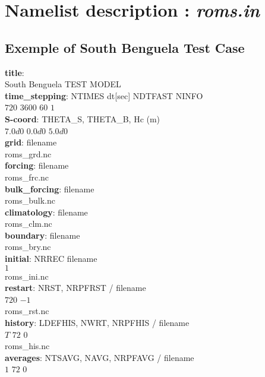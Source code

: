 \section{Namelist description : \textit{roms.in}}\label{namelistdesc}

\subsection{Exemple of South Benguela Test Case}
\textbf{title}: \\
        South Benguela TEST MODEL \\
\textbf{time\_stepping}: NTIMES   dt[sec]  NDTFAST  NINFO \\
                $720$      $3600$     $60$      $1$ \\
\textbf{S-coord}: THETA\_S,   THETA\_B,    Hc (m) \\
           $7.0d0$      $0.0d0$      $5.0d0$ \\
\textbf{grid}:  filename \\
                          roms\_grd.nc \\
\textbf{forcing}: filename \\
                          roms\_frc.nc \\
\textbf{bulk\_forcing}: filename \\
                          roms\_bulk.nc \\
\textbf{climatology}: filename \\ 
                          roms\_clm.nc\\ 
\textbf{boundary}: filename \\
                          roms\_bry.nc \\
\textbf{initial}: NRREC  filename \\
          $1$  \\
                          roms\_ini.nc \\
\textbf{restart}:          NRST, NRPFRST / filename \\
                   $720$    $-1$ \\
                          roms\_rst.nc \\
\textbf{history}: LDEFHIS, NWRT, NRPFHIS / filename  \\
            $T$      $72$     $0$ \\ 
                          roms\_his.nc \\
\textbf{averages}: NTSAVG, NAVG, NRPFAVG / filename \\
            $1$      $72$     $0$ \\
